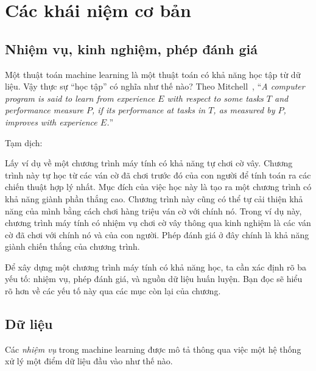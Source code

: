 
\chapter{Các khái niệm cơ bản}


\section{Nhiệm vụ, kinh nghiệm, phép đánh giá}
Một thuật toán machine learning là một thuật toán có khả năng {học tập} từ dữ
liệu. Vậy thực sự ``học tập'' có nghĩa như thế nào? Theo
Mitchell~\cite{mitchell1997machine}, ``\textit{A computer program is said to learn from
\textit{experience} $E$ with respect to some \textit{tasks} $T$ and
\textit{performance measure} $P$, if its performance at tasks in $T$, as
measured by $P$, improves with experience $E$.}''

Tạm dịch: 


Lấy ví dụ về một chương trình máy tính có khả năng tự chơi cờ vây. Chương trình này tự học từ các ván cờ đã chơi trước đó của con người để tính toán ra các chiến thuật hợp lý nhất. Mục đích của việc học này là tạo ra một chương trình có khả năng giành phần thắng cao. Chương trình này cũng có thể tự cải thiện khả năng của mình bằng cách chơi hàng triệu ván cờ với chính nó. Trong ví dụ này, chương trình máy tính có nhiệm vụ chơi cờ vây thông qua kinh nghiệm là {các ván cờ đã chơi} với chính nó và của con người. Phép đánh giá ở đây chính là khả năng giành chiến thắng của chương trình.

Để xây dựng một chương trình máy tính có khả năng học, ta cần xác định rõ ba yếu tố: nhiệm vụ, phép đánh giá, và nguồn dữ liệu huấn luyện. Bạn đọc sẽ hiểu rõ hơn về các yếu tố này qua các mục còn lại của chương. 

\section{Dữ liệu}
Các \textit{nhiệm vụ} trong machine learning được mô tả thông qua việc
một hệ thống xử lý một điểm dữ liệu đầu vào như thế nào. 

